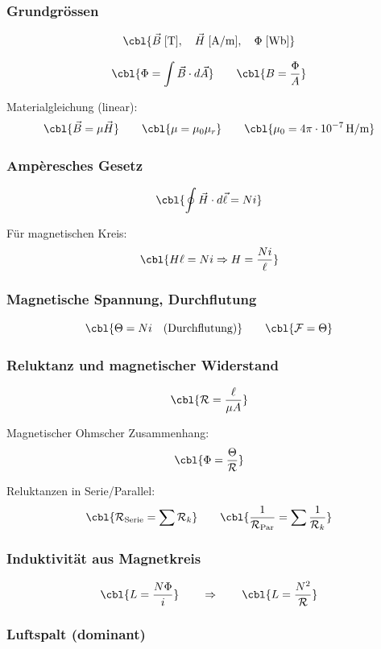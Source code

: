 \subsubsection{Grundgrössen}

\[
\cbl{\vec{B} \;[\mathrm{T}], \quad \vec{H}\;[\mathrm{A/m}], \quad \Phi\;[\mathrm{Wb}]}
\]

\[
\cbl{\Phi = \int \vec{B}\cdot d\vec{A}}
\qquad
\cbl{B = \frac{\Phi}{A}}
\]

Materialgleichung (linear):
\[
\cbl{\vec{B} = \mu \vec{H}}
\qquad
\cbl{\mu = \mu_0 \mu_r}
\qquad
\cbl{\mu_0 = 4\pi \cdot 10^{-7}\,\mathrm{H/m}}
\]

\subsubsection{Ampèresches Gesetz}

\[
\cbl{\oint \vec{H}\cdot d\vec{\ell} = N i}
\]

Für magnetischen Kreis:
\[
\cbl{H \ell = N i \Rightarrow H = \frac{N i}{\ell}}
\]

\subsubsection{Magnetische Spannung, Durchflutung}

\[
\cbl{\Theta = N i \quad \text{(Durchflutung)}}
\qquad
\cbl{\mathcal{F}=\Theta}
\]

\subsubsection{Reluktanz und magnetischer Widerstand}

\[
\cbl{\mathcal{R} = \frac{\ell}{\mu A}}
\]

Magnetischer Ohmscher Zusammenhang:
\[
\cbl{\Phi = \frac{\Theta}{\mathcal{R}}}
\]

Reluktanzen in Serie/Parallel:
\[
\cbl{\mathcal{R}_{\mathrm{Serie}} = \sum \mathcal{R}_k}
\qquad
\cbl{\frac{1}{\mathcal{R}_{\mathrm{Par}}} = \sum \frac{1}{\mathcal{R}_k}}
\]

\subsubsection{Induktivität aus Magnetkreis}

\[
\cbl{L = \frac{N\Phi}{i}}
\qquad
\Rightarrow
\qquad
\cbl{L = \frac{N^2}{\mathcal{R}}}
\]

\subsubsection{Luftspalt (dominant)}


